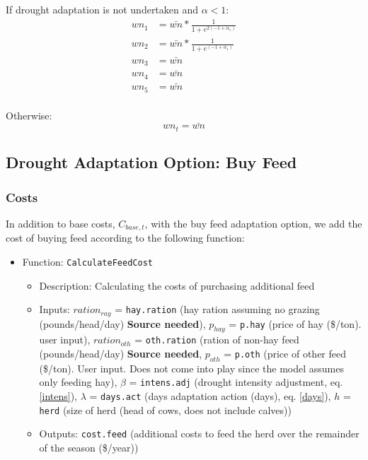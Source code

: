 \documentclass[11pt]{article}
\begin{document}
If drought adaptation is not undertaken and $\alpha < 1$:
\begin{align}
wn_1 &= \bar{wn} * \frac{1}{1 + e^{2(-1 + \alpha_1)}} \\
wn_2 &= \bar{wn} * \frac{1}{1 + e^{(-1 + \alpha_1)}} \\
wn_3 &= \bar{wn} \\
wn_4 &= \bar{wn} \\
wn_5 &= \bar{wn} \\
\end{align}

Otherwise: 
\begin{equation}
wn_t = \bar{wn}
\end{equation}



\subsection{Drought Adaptation Option: Buy Feed}
\subsubsection{Costs}
In addition to base costs, $C_{base,t}$, with the buy feed adaptation option, we add the cost of buying feed according to the following function:
\begin{itemize}
\item Function: \verb!CalculateFeedCost!
	\begin{itemize}
	\item Description: Calculating the costs of purchasing additional feed
	\item Inputs: $ration_{ray}$ = \verb!hay.ration! (hay ration assuming no grazing (pounds/head/day) \textbf{Source needed}), $p_{hay}$ = \verb!p.hay! (price of hay (\$/ton). user input), $ration_{oth}$ = \verb!oth.ration! (ration of non-hay feed (pounds/head/day) \textbf{Source needed}, $p_{oth}$ = \verb!p.oth! (price of other feed (\$/ton). User input. Does not come into play since the model assumes only feeding hay), $\beta$ = \verb!intens.adj! (drought intensity adjustment, eq. \ref{intens}), $\lambda$ = \verb!days.act! (days adaptation action (days), eq. \ref{days}), $h$ = \verb!herd! (size of herd (head of cows, does not include calves))
	\item Outputs: \verb!cost.feed! (additional costs to feed the herd over the remainder of the season (\$/year))
	\end{itemize}
\end{itemize}
\end{document}
